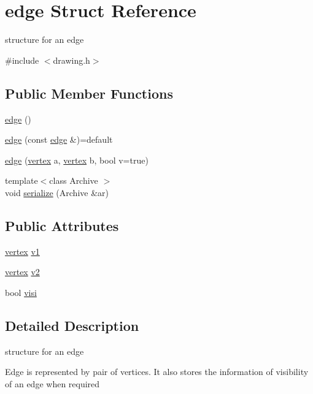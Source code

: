 \hypertarget{structedge}{}\section{edge Struct Reference}
\label{structedge}


structure for an edge  




{\ttfamily \#include $<$drawing.\+h$>$}

\subsection*{Public Member Functions}
\begin{DoxyCompactItemize}
\item 
\hyperlink{structedge_ac8047a0d7c1e08a4063be409c6fd0a88}{edge} ()
\item 
\hyperlink{structedge_a1139f4b252b4954aed96da719f453295}{edge} (const \hyperlink{structedge}{edge} \&)=default
\item 
\hyperlink{structedge_ac18f49be19de3cc4913162108f48b8c4}{edge} (\hyperlink{structvertex}{vertex} a, \hyperlink{structvertex}{vertex} b, bool v=true)
\item 
{\footnotesize template$<$class Archive $>$ }\\void \hyperlink{structedge_a40a1767d3faf4d9702983449d4b8073f}{serialize} (Archive \&ar)
\end{DoxyCompactItemize}
\subsection*{Public Attributes}
\begin{DoxyCompactItemize}
\item 
\hyperlink{structvertex}{vertex} \hyperlink{structedge_a0209c03c9479528b2e060d4d0e58b461}{v1}
\item 
\hyperlink{structvertex}{vertex} \hyperlink{structedge_a5b849de3794f7e5126fc8f03199d568c}{v2}
\item 
bool \hyperlink{structedge_a54ab8c55c0ae9afc90ca387753a9dbee}{visi}
\end{DoxyCompactItemize}


\subsection{Detailed Description}
structure for an edge 

Edge is represented by pair of vertices. It also stores the information of visibility of an edge when required 

